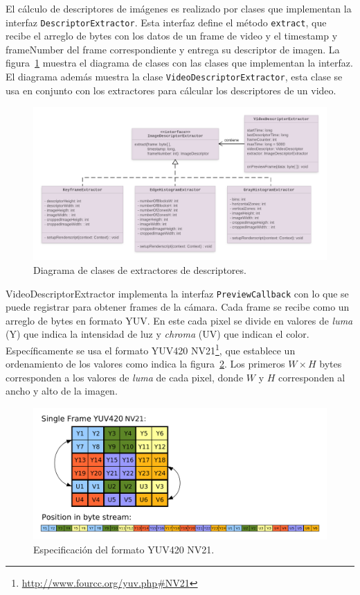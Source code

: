 El cálculo de descriptores de imágenes es realizado por clases que implementan la interfaz \texttt{DescriptorExtractor}. Esta interfaz define el método \texttt{extract}, que recibe el arreglo de bytes con los datos de un frame de video y el timestamp y frameNumber del frame correspondiente y entrega su descriptor de imagen. La figura~\ref{diagrama_clases_extractores} muestra el diagrama de clases con las clases que implementan la interfaz. El diagrama además muestra la clase \texttt{VideoDescriptorExtractor}, esta clase se usa en conjunto con los extractores para cálcular los descriptores de un video.
	\begin{figure}[!h]
		\centering
		\includegraphics[scale=1.6]{imagenes/cap4/diagrama_clases_extractores.png}
		\caption{Diagrama de clases de extractores de descriptores.}
		\label{diagrama_clases_extractores}
	\end{figure}

VideoDescriptorExtractor implementa la interfaz \texttt{PreviewCallback} con lo que se puede registrar para obtener frames de la cámara. Cada frame se recibe como un arreglo de bytes en formato YUV. En este cada pixel se divide en valores de \emph{luma} (Y) que indica la intensidad de luz y \emph{chroma} (UV) que indican el color. Específicamente se usa el formato YUV420 NV21\footnote{\url{http://www.fourcc.org/yuv.php\#NV21}}, que establece un ordenamiento de los valores como indica la figura~\ref{formato_yuv}. Los primeros $W \times H$ bytes corresponden a los valores de \emph{luma} de cada pixel, donde $W$ y $H$ corresponden al ancho y alto de la imagen.  
	\begin{figure}[!h]
		\centering
		\includegraphics[scale=0.3]{imagenes/cap4/yuv.png}
		\caption{Especificación del formato YUV420 NV21.}
		\label{formato_yuv}
	\end{figure}

